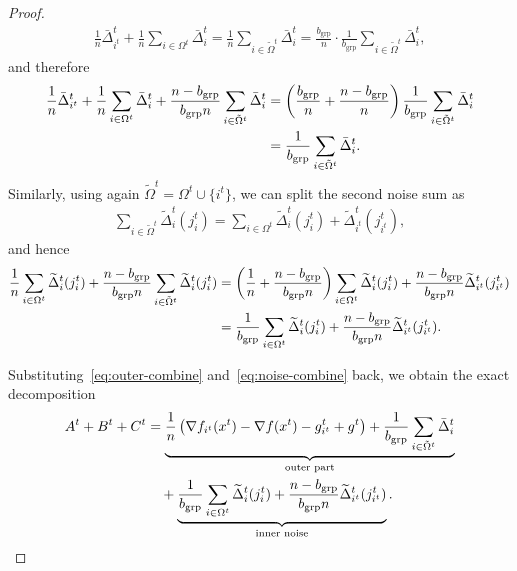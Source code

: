 \documentclass{article}
\theoremstyle{plain}
\begin{document}
\begin{proof}
\begin{align*}
\frac{1}{n}\bar{\Delta}_{i^t}^t+\frac{1}{n}\sum_{i\in\Omega^t}\bar{\Delta}_i^t
=\frac{1}{n}\sum_{i\in\tilde{\Omega}^t}\bar{\Delta}_i^t
=\frac{b_{\mathrm{grp}}}{n}\cdot \frac{1}{b_{\mathrm{grp}}}\sum_{i\in\tilde{\Omega}^t}\bar{\Delta}_i^t,
\end{align*}
and therefore
\begin{align}
\frac{1}{n}\bar{\Delta}_{i^t}^t+\frac{1}{n}\sum_{i\in\Omega^t}\bar{\Delta}_i^t+\frac{n-b_{\mathrm{grp}}}{b_{\mathrm{grp}}n}\sum_{i\in\tilde{\Omega}^t}\bar{\Delta}_i^t
&=\left(\frac{b_{\mathrm{grp}}}{n}+\frac{n-b_{\mathrm{grp}}}{n}\right)\frac{1}{b_{\mathrm{grp}}}\sum_{i\in\tilde{\Omega}^t}\bar{\Delta}_i^t \notag\\
&=\frac{1}{b_{\mathrm{grp}}}\sum_{i\in\tilde{\Omega}^t}\bar{\Delta}_i^t.
\label{eq:outer-combine}
\end{align}
Similarly, using again $\tilde{\Omega}^t=\Omega^t\cup\{i^t\}$, we can split the second noise sum as
\begin{align}
\label{eq:noise-split}
\sum_{i\in\tilde{\Omega}^t}\widetilde{\Delta}_i^t(j_i^t)
=\sum_{i\in\Omega^t}\widetilde{\Delta}_i^t(j_i^t)+\widetilde{\Delta}_{i^t}^t(j_{i^t}^t),
\end{align}
and hence
\begin{align}
\frac{1}{n}\sum_{i\in\Omega^t}\widetilde{\Delta}_i^t(j_i^t)+\frac{n-b_{\mathrm{grp}}}{b_{\mathrm{grp}}n}\sum_{i\in\tilde{\Omega}^t}\widetilde{\Delta}_i^t(j_i^t)
&=\left(\frac{1}{n}+\frac{n-b_{\mathrm{grp}}}{b_{\mathrm{grp}}n}\right)\sum_{i\in\Omega^t}\widetilde{\Delta}_i^t(j_i^t)
+\frac{n-b_{\mathrm{grp}}}{b_{\mathrm{grp}}n}\widetilde{\Delta}_{i^t}^t(j_{i^t}^t)\notag\\
&=\frac{1}{b_{\mathrm{grp}}}\sum_{i\in\Omega^t}\widetilde{\Delta}_i^t(j_i^t)
+\frac{n-b_{\mathrm{grp}}}{b_{\mathrm{grp}}n}\widetilde{\Delta}_{i^t}^t(j_{i^t}^t).
\label{eq:noise-combine}
\end{align}

Substituting~\eqref{eq:outer-combine} and~\eqref{eq:noise-combine} back, we obtain the exact decomposition
\begin{align}
\label{eq:ABC-decomp}
A^t+B^t+C^t
&=\underbrace{\frac{1}{n}\left(\nabla f_{i^t}(x^{t})-\nabla f(x^{t})-g_{i^t}^t+g^t\right)
+\frac{1}{b_{\mathrm{grp}}}\sum_{i\in\tilde{\Omega}^t}\bar{\Delta}_i^t}_{\text{outer part}} \notag\\
&\quad +\underbrace{\frac{1}{b_{\mathrm{grp}}}\sum_{i\in\Omega^t}\widetilde{\Delta}_i^t(j_i^t)
+\frac{n-b_{\mathrm{grp}}}{b_{\mathrm{grp}}n}\widetilde{\Delta}_{i^t}^t(j_{i^t}^t)}_{\text{inner noise}}.
\end{align}


\end{proof}
\end{document}
